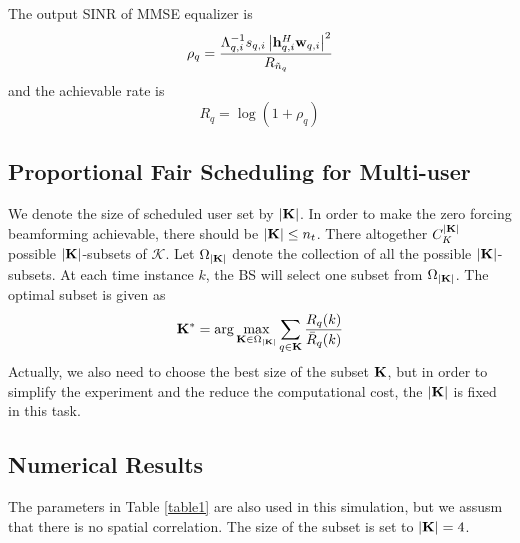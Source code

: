\documentclass[10pt,conference]{IEEEtran}
\begin{document}
The output SINR of MMSE equalizer is 
\begin{equation}
    \rho_q = \frac{\Lambda_{q,i}^{-1} s_{q,i} \left|{\bf{h}}_{q,i}^H {\bf{w}}_{q,i} \right|^2}{R_{\tilde{n}_q}} \label{eq32}
\end{equation}
and the achievable rate is 
\begin{equation}
    R_q = \log(1+\rho_q) \label{eq33}
\end{equation}

\subsection{Proportional Fair Scheduling for Multi-user}
We denote the size of scheduled user set by $\left| {\bf{K}} \right|$. 
In order to make the zero forcing beamforming achievable, there should be 
$\left| {\bf{K}} \right| \leq n_t$. There altogether $C_K^{\left| {\bf{K}} \right|}$
possible $\left| {\bf{K}} \right|$-subsets of $\mathcal{K}$. Let $\Omega_{\left| {\bf{K}} \right|}$
denote the collection of all the possible $\left| {\bf{K}} \right|$-subsets. At each
time instance $k$, the BS will select one subset from $\Omega_{\left| {\bf{K}} \right|}$.
The optimal subset is given as 
\begin{equation}
    {\bf{K}}^* = \arg \max_{{\bf{K}} \in \Omega_{\left| {\bf{K}} \right|}} \sum_{q \in {\bf{K}}} \frac{R_q(k)}{\bar{R}_q(k)} \label{34}
\end{equation}
Actually, we also need to choose the best size of the subset ${\bf{K}}$, but in order to simplify 
the experiment and the reduce the computational cost, the $|{\bf{K}}|$ is fixed in this task.

\subsection{Numerical Results}
The parameters in Table \ref{table1} are also used in this simulation, but we assusm
that there is no spatial correlation. The size of the subset is set to $\left| {\bf{K}} \right|=4$.
\end{document}
